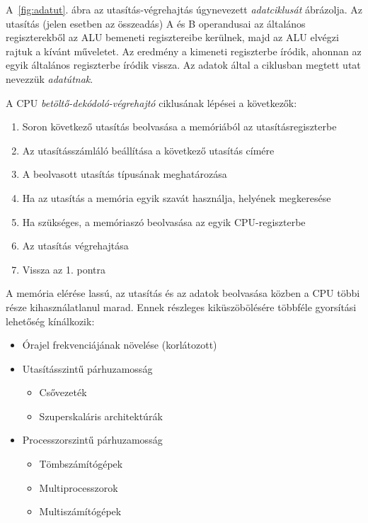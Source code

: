 \documentclass[a4paper]{article}
\begin{document}
A~\ref{fig:adatut}. ábra az utasítás-végrehajtás úgynevezett \emph{adatciklusát} ábrázolja. Az utasítás (jelen esetben az összeadás) A és B operandusai az általános regiszterekből az ALU bemeneti regisztereibe kerülnek, majd az ALU elvégzi rajtuk a kívánt műveletet. Az eredmény a kimeneti regiszterbe íródik, ahonnan az egyik általános regiszterbe íródik vissza. Az adatok által a ciklusban megtett utat nevezzük \emph{adatútnak}.

A CPU \emph{betöltő-dekódoló-végrehajtó} ciklusának lépései a következők:

\begin{enumerate}
	\item Soron következő utasítás beolvasása a memóriából az utasításregiszterbe
	\item Az utasításszámláló beállítása a következő utasítás címére
	\item A beolvasott utasítás típusának meghatározása
	\item Ha az utasítás a memória egyik szavát használja, helyének megkeresése
	\item Ha szükséges, a memóriaszó beolvasása az egyik CPU-regiszterbe
	\item Az utasítás végrehajtása
	\item Vissza az 1. pontra
\end{enumerate}

A memória elérése lassú, az utasítás és az adatok beolvasása közben a CPU többi része kihasználatlanul marad. Ennek részleges kiküszöbölésére többféle gyorsítási lehetőség kínálkozik:

\begin{itemize}
	\item Órajel frekvenciájának növelése (korlátozott)
	\item Utasításszintű párhuzamosság
		\begin{itemize}
			\item Csővezeték
			\item Szuperskaláris architektúrák
		\end{itemize}
	\item Processzorszintű párhuzamosság
		\begin{itemize}
			\item Tömbszámítógépek
			\item Multiprocesszorok
			\item Multiszámítógépek
		\end{itemize}
\end{itemize}
\end{document}

